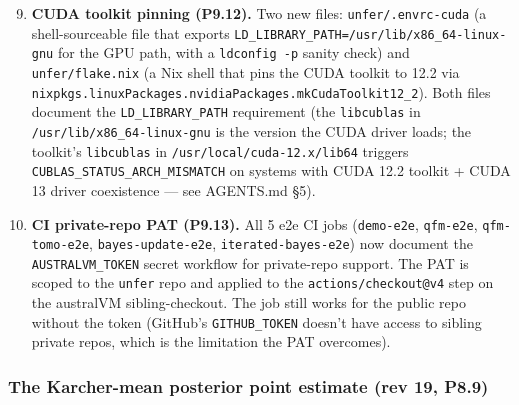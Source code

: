 \documentclass[11pt, a4paper]{article}
\begin{document}
\begin{enumerate}
\setcounter{enumi}{8}
\item \textbf{CUDA toolkit pinning (P9.12).} Two new files:
  \texttt{unfer/.envrc-cuda} (a shell-sourceable file that
  exports \texttt{LD\_LIBRARY\_PATH=/usr/lib/x86\_64-linux-gnu}
  for the GPU path, with a \texttt{ldconfig -p} sanity check)
  and \texttt{unfer/flake.nix} (a Nix shell that pins the CUDA
  toolkit to 12.2 via \texttt{nixpkgs.linuxPackages.nvidiaPackages.mkCudaToolkit12\_2}).
  Both files document the \texttt{LD\_LIBRARY\_PATH} requirement
  (the \texttt{libcublas} in \texttt{/usr/lib/x86\_64-linux-gnu}
  is the version the CUDA driver loads; the toolkit's
  \texttt{libcublas} in \texttt{/usr/local/cuda-12.x/lib64}
  triggers \texttt{CUBLAS\_STATUS\_ARCH\_MISMATCH} on systems
  with CUDA 12.2 toolkit + CUDA 13 driver coexistence --- see
  AGENTS.md \S5).

\item \textbf{CI private-repo PAT (P9.13).} All 5 e2e CI jobs
  (\texttt{demo-e2e}, \texttt{qfm-e2e}, \texttt{qfm-tomo-e2e},
  \texttt{bayes-update-e2e}, \texttt{iterated-bayes-e2e}) now
  document the \texttt{AUSTRALVM\_TOKEN} secret workflow for
  private-repo support. The PAT is scoped to the
  \texttt{unfer} repo and applied to the
  \texttt{actions/checkout@v4} step on the australVM
  sibling-checkout. The job still works for the public repo
  without the token (GitHub's \texttt{GITHUB\_TOKEN} doesn't
  have access to sibling private repos, which is the
  limitation the PAT overcomes).
\end{enumerate}

\subsubsection*{The Karcher-mean posterior point estimate (rev 19, P8.9)}
\end{document}
